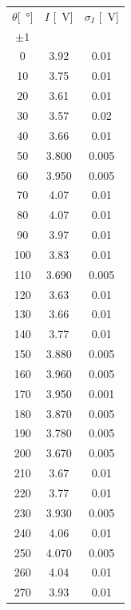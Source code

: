 \documentclass[10pt,oneside,a4paper]{article}
\begin{document}
\begin{minipage}[t]{0.3\linewidth}
\begin{center}
\label{tab:align}
\begin{tabular}{c|c|c}
\toprule
$\theta$[\SI{}{\degree}] &  $I$ [\SI{}{V}] &  $\sigma_{I}$ [\SI{}{V}] \\
     $\pm 1$ & & \\
\midrule
0 &    3.92 &            0.01 \\
10 &    3.75 &            0.01 \\
20 &    3.61 &            0.01 \\
30 &    3.57 &            0.02 \\
40 &    3.66 &            0.01 \\
50 &    3.800 &            0.005 \\
60 &    3.950 &            0.005 \\
70 &    4.07 &            0.01 \\
80 &    4.07 &            0.01 \\
90 &    3.97 &            0.01 \\
100 &    3.83 &            0.01 \\
110 &    3.690 &            0.005 \\
120 &    3.63 &            0.01 \\
130 &    3.66 &            0.01 \\
140 &    3.77 &            0.01 \\
150 &    3.880 &            0.005 \\
160 &    3.960 &            0.005 \\
170 &    3.950 &            0.001 \\
180 &    3.870 &            0.005 \\
190 &    3.780 &            0.005 \\
200 &    3.670 &            0.005 \\
210 &    3.67 &            0.01 \\
220 &    3.77 &            0.01 \\
230 &    3.930 &            0.005 \\
240 &    4.06 &            0.01 \\
250 &    4.070 &            0.005 \\
260 &    4.04 &            0.01 \\
270 &    3.93 &            0.01 \\

\end{tabular}
\end{center}
\end{minipage}
\end{document}
